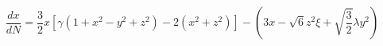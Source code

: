 \begin{equation}\label{auto1}
\frac{dx}{dN}=\frac{3}{2}x[\gamma(1+x^2-y^2+z^2)-2(x^2+z^2)]-(3x-\sqrt{6}z^2\xi+\sqrt{\frac{3}{2}}\lambda
y^2)
\end{equation}


